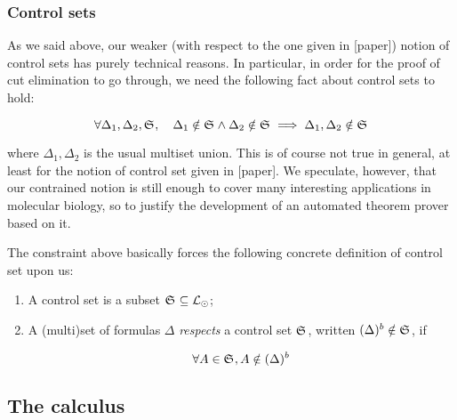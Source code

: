 \subsubsection{Control sets}

As we said above, our weaker (with respect to the one given in [paper]) notion
of control sets has purely technical reasons. In particular, in order for the
proof of cut elimination to go through, we need the following fact about control
sets to hold:

\[
  \forall \Delta_1, \Delta_2, \mathfrak{S}_{},\quad
  \Delta_1 \notin \mathfrak{S}_{} \wedge \Delta_2 \notin \mathfrak{S}_{}
  \implies
  \Delta_1, \Delta_2 \notin \mathfrak{S}_{}
\]

where $\Delta_1, \Delta_2$ is the usual multiset union. This is of course not
true in general, at least for the notion of control set given in [paper].  We
speculate, however, that our contrained notion is still enough to cover many
interesting applications in molecular biology, so to justify the development of
an automated theorem prover based on it.

The constraint above basically forces the following concrete definition of
control set upon us:

\begin{definition}
  \begin{enumerate}
  \item A control set is a subset $\mathfrak{S}_{} \subseteq \mathcal{L}_{\odot}$;
  \item A (multi)set of formulas $\Delta$ \emph{respects} a control set
    $\mathfrak{S}_{}$, written $(\Delta)^{b} \notin \mathfrak{S}_{}$, if

    \[
      \forall A \in \mathfrak{S}_{}, A \notin (\Delta)^{b}
    \]

  \end{enumerate}
\end{definition}

\subsection{The calculus \eznd{}}



